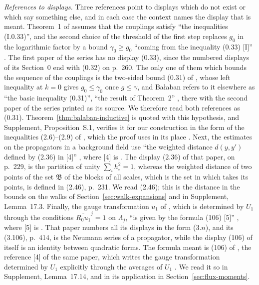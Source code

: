 \documentclass[11pt]{preprint}
\numberwithin{equation}{section}
\theoremstyle{definition}
\theoremstyle{remark}
\theoremstyle{plain}
\begin{document}
\emph{References to displays.} Three references point to displays which do not exist or which say something else, and in each case the context names the display that is meant. Theorem~1 of \cite[p.~262]{BalabanCRE} assumes that the couplings satisfy ``the inequalities (I.0.33)'', and the second choice of the threshold of the first step replaces $g_0$ in the logarithmic factor by a bound $\gamma_0 \geq g_0$ ``coming from the inequality (0.33) [I]'' \cite[p.~246]{BalabanCRE}. The first paper of the series has no display (0.33), since the numbered displays of its Section~0 end with (0.32) on p.~260. The only one of them which bounds the sequence of the couplings is the two-sided bound (0.31) of \cite[Theorem~2, p.~259]{BalabanRG1}, whose left inequality at $k = 0$ gives $g_0 \leq \gamma_0$ once $g \leq \gamma$, and Ba{\l}aban refers to it elsewhere as ``the basic inequality (0.31)'', ``the result of Theorem~2'' \cite[p.~355]{BalabanLFR2}, there with the second paper of the series printed as its source. We therefore read both references as (0.31). Theorem~\ref{thm:balaban-inductive} is quoted with this hypothesis, and Supplement, Proposition~S.1, verifies it for our construction in the form of the inequalities (2.6)--(2.9) of \cite[pp.~255--256]{BalabanCRE}, which the proof uses in its place \cite[p.~255]{BalabanCRE}. Next, the estimates on the propagators in a background field use ``the weighted distance $d(y,y')$ defined by (2.36) in [4]'' \cite[p.~397]{BalabanPBG}, where [4] is \cite{BalabanPRT2}. The display (2.36) of that paper, on p.~229, is the partition of unity $\sum_\square h_\square^2 = 1$, whereas the weighted distance of two points of the set $\mathfrak B$ of the blocks of all scales, which is the set in which \cite{BalabanPBG} takes its points, is defined in (2.46), p.~231. We read (2.46); this is the distance in the bounds on the walks of Section~\ref{sec:walk-expansions} and in Supplement, Lemma~17.3. Finally, the gauge transformation $u_1$ of \cite[(124), p.~296]{BalabanVAR}, which is determined by $U_1$ through the conditions $\overline{R_0u_1}^j = 1$ on $\Lambda_j$, ``is given by the formula (106) [5]'' \cite[pp.~296--297]{BalabanVAR}, where [5] is \cite{BalabanPBG}. That paper numbers all its displays in the form (3.$n$), and its (3.106), p.~414, is the Neumann series of a propagator, while the display (106) of \cite[p.~294]{BalabanVAR} itself is an identity between quadratic forms. The formula meant is (106) of \cite[p.~33]{BalabanAVG}, the reference [4] of the same paper, which writes the gauge transformation determined by $U_1$ explicitly through the averages of $U_1$ \cite[pp.~32--33]{BalabanAVG}. We read it so in Supplement, Lemma~17.14, and in its application in Section~\ref{sec:flux-moments}.
\end{document}
